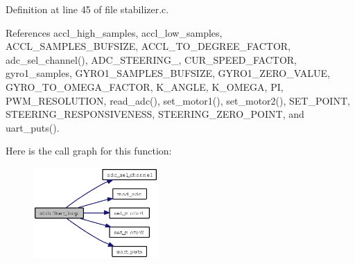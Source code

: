 Definition at line 45 of file stabilizer.c.

References accl\_\-high\_\-samples, accl\_\-low\_\-samples, ACCL\_\-SAMPLES\_\-BUFSIZE, ACCL\_\-TO\_\-DEGREE\_\-FACTOR, adc\_\-sel\_\-channel(), ADC\_\-STEERING\_, CUR\_\-SPEED\_\-FACTOR, gyro1\_\-samples, GYRO1\_\-SAMPLES\_\-BUFSIZE, GYRO1\_\-ZERO\_\-VALUE, GYRO\_\-TO\_\-OMEGA\_\-FACTOR, K\_\-ANGLE, K\_\-OMEGA, PI, PWM\_\-RESOLUTION, read\_\-adc(), set\_\-motor1(), set\_\-motor2(), SET\_\-POINT, STEERING\_\-RESPONSIVENESS, STEERING\_\-ZERO\_\-POINT, and uart\_\-puts().

Here is the call graph for this function:\begin{figure}[H]
\begin{center}
\leavevmode
\includegraphics[width=135pt]{stabilizer_8c_cc3a7bb7e4532b65fe366e14f3778f86_cgraph}
\end{center}
\end{figure}
